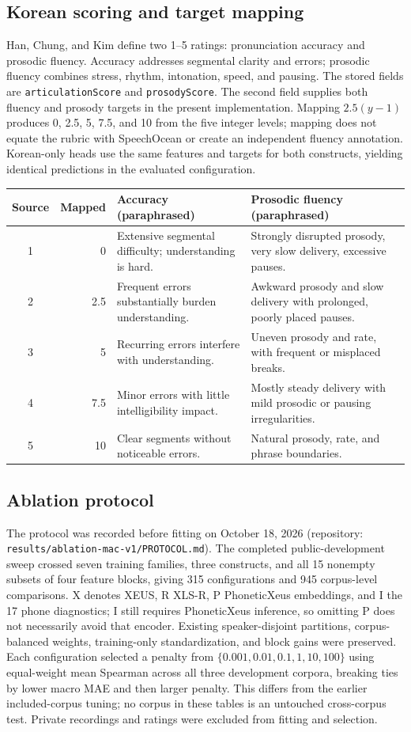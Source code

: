 \documentclass[10pt]{article}
\begin{document}
\subsection{Korean scoring and target mapping}
Han, Chung, and Kim \cite{han} define two 1--5 ratings: pronunciation accuracy and prosodic fluency. Accuracy addresses segmental clarity and errors; prosodic fluency combines stress, rhythm, intonation, speed, and pausing. The stored fields are \texttt{articulationScore} and \texttt{prosodyScore}. The second field supplies both fluency and prosody targets in the present implementation. Mapping $2.5(y-1)$ produces 0, 2.5, 5, 7.5, and 10 from the five integer levels; mapping does not equate the rubric with SpeechOcean or create an independent fluency annotation. Korean-only heads use the same features and targets for both constructs, yielding identical predictions in the evaluated configuration.
\begin{center}\begin{tabular}{@{}crp{5.4cm}p{5.4cm}@{}}\toprule
Source & Mapped & Accuracy (paraphrased) & Prosodic fluency (paraphrased)\\\midrule
1 & 0 & Extensive segmental difficulty; understanding is hard. & Strongly disrupted prosody, very slow delivery, excessive pauses.\\
2 & 2.5 & Frequent errors substantially burden understanding. & Awkward prosody and slow delivery with prolonged, poorly placed pauses.\\
3 & 5 & Recurring errors interfere with understanding. & Uneven prosody and rate, with frequent or misplaced breaks.\\
4 & 7.5 & Minor errors with little intelligibility impact. & Mostly steady delivery with mild prosodic or pausing irregularities.\\
5 & 10 & Clear segments without noticeable errors. & Natural prosody, rate, and phrase boundaries.\\\bottomrule
\end{tabular}\end{center}
\subsection{Ablation protocol}
The protocol was recorded before fitting on October 18, 2026 (repository: \nolinkurl{results/ablation-mac-v1/PROTOCOL.md}). The completed public-development sweep crossed seven training families, three constructs, and all 15 nonempty subsets of four feature blocks, giving 315 configurations and 945 corpus-level comparisons. X denotes XEUS, R XLS-R, P PhoneticXeus embeddings, and I the 17 phone diagnostics; I still requires PhoneticXeus inference, so omitting P does not necessarily avoid that encoder. Existing speaker-disjoint partitions, corpus-balanced weights, training-only standardization, and block gains were preserved. Each configuration selected a penalty from $\{0.001,0.01,0.1,1,10,100\}$ using equal-weight mean Spearman across all three development corpora, breaking ties by lower macro MAE and then larger penalty. This differs from the earlier included-corpus tuning; no corpus in these tables is an untouched cross-corpus test. Private recordings and ratings were excluded from fitting and selection.
\end{document}
